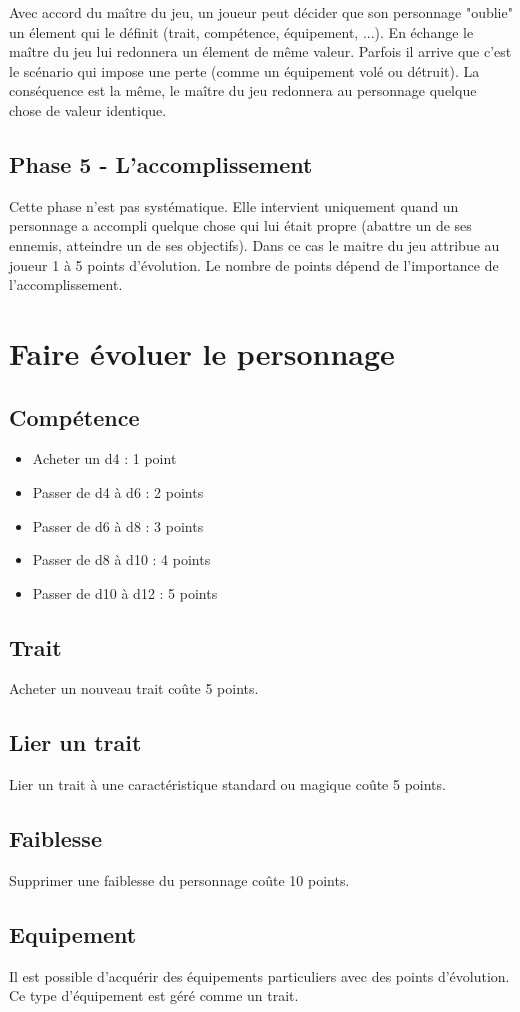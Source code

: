 Avec accord du maître du jeu, un joueur peut décider que son personnage "oublie" un élement qui le définit (trait, compétence, équipement, ...). En échange le maître du jeu lui redonnera un élement de même valeur. Parfois il arrive que c'est le scénario qui impose une perte (comme un équipement volé ou détruit). La conséquence est la même, le maître du jeu redonnera au personnage quelque chose de valeur identique.

\subsection{Phase 5 - L'accomplissement}

Cette phase n'est pas systématique. Elle intervient uniquement quand un personnage a accompli quelque chose qui lui était propre (abattre un de ses ennemis, atteindre un de ses objectifs). Dans ce cas le maitre du jeu attribue au joueur 1 à 5 points d'évolution. Le nombre de points dépend de l'importance de l'accomplissement.

\section{Faire évoluer le personnage}

\subsection{Compétence}

\begin{itemize}
\item Acheter un d4 : 1 point
\item Passer de d4 à d6 : 2 points
\item Passer de d6 à d8 : 3 points
\item Passer de d8 à d10 : 4 points
\item Passer de d10 à d12 : 5 points
\end{itemize} \smallskip

\subsection{Trait}

Acheter un nouveau trait coûte 5 points.

\subsection{Lier un trait}

Lier un trait à une caractéristique standard ou magique coûte 5 points.

\subsection{Faiblesse}

Supprimer une faiblesse du personnage coûte 10 points.

\subsection{Equipement}

Il est possible d'acquérir des équipements particuliers avec des points d'évolution. Ce type d'équipement est géré comme un trait.

